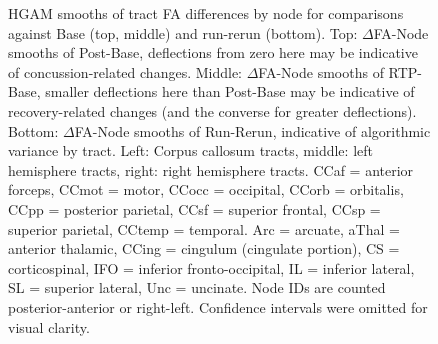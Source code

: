 \documentclass[12pt]{article}
\begin{document}
\begin{figure}[H]
	\centering
	\caption{HGAM smooths of tract FA differences by node for comparisons against Base (top, middle) and run-rerun (bottom). Top: $\Delta$FA-Node smooths of Post-Base, deflections from zero here may be indicative of concussion-related changes. Middle: $\Delta$FA-Node smooths of RTP-Base, smaller deflections here than Post-Base may be indicative of recovery-related changes (and the converse for greater deflections). Bottom: $\Delta$FA-Node smooths of Run-Rerun, indicative of algorithmic variance by tract. Left: Corpus callosum tracts, middle: left hemisphere tracts, right: right hemisphere tracts. CCaf = anterior forceps, CCmot = motor, CCocc = occipital, CCorb = orbitalis, CCpp = posterior parietal, CCsf = superior frontal, CCsp = superior parietal, CCtemp = temporal. Arc = arcuate, aThal = anterior thalamic, CCing = cingulum (cingulate portion), CS = corticospinal, IFO = inferior fronto-occipital, IL = inferior lateral, SL = superior lateral, Unc = uncinate. Node IDs are counted posterior-anterior or right-left. Confidence intervals were omitted for visual clarity.}
	\label{fig:ldi-gam}
\end{figure}
\end{document}
